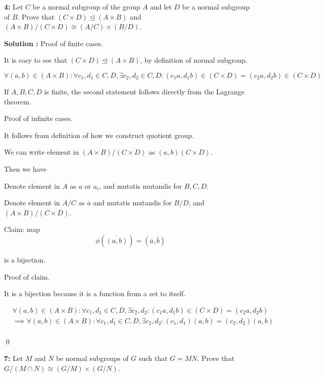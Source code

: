 \documentclass[11pt]{article}
\newenvironment{exercise}[1]
	{\noindent \textbf{#1:}}
	{\par \vspace{0.5\baselineskip}}
\newenvironment{solution}[1][\unskip]
	{\noindent \textbf{Solution #1:} }
	{\qed \pagebreak}
\begin{document}
\begin{exercise}{4}
	Let $C$	be a normal subgroup of the group $A$ and let $D$ be a normal subgroup of $B$.
	Prove that $(C \times D) \trianglelefteq (A \times B)$ and
	$(A \times B) / (C \times D) \cong (A / C) \times (B / D)$.
\end{exercise}

\begin{solution}
	Proof of finite cases.

	It is easy to see that $(C \times D) \trianglelefteq (A \times B)$,
	by definition of normal subgroup.

	\[
		\forall (a,b) \in (A \times B) : \forall  c_1,d_1 \in C,D, \exists c_2, d_2 \in C,D :
		(c_1a,d_1b) \in (C \times D) = (c_2a,d_2b) \in (C \times D)
	\]

	If $A,B,C,D$ is finite, the second statement follows directly from the Lagrange theorem.

	Proof of infinite cases.

	It follows from definition of how we construct quotient group.

	We can write element in $(A \times B)/(C \times D)$	as $(a,b)(C \times D)$.

	Then we have

	Denote element in $A$ as $a$ or $a_i$, and mutatis mutandis for $B,C,D$.

	Denote element in $A/C$ as $\overline{a}$ and mutatis mutandis for $B/D$, and $(A \times B) / (C \times D)$.

	Claim: map
	\[
		\phi(\overline{(a, b)}) = (\overline{a}, \overline{b})
	\]

	is a bijection.

	Proof of claim.

	It is a bijection because it is a function from a set to itself.

	\[
		\begin{split}
			& \forall (a,b) \in (A \times B) : \forall  c_1,d_1 \in C,D, \exists c_2, d_2 :
			(c_1a,d_1b) \in (C \times D) = (c_2a,d_2b)\\
			& \implies \forall (a,b) \in (A \times B) : \forall  c_1,d_1 \in C,D, \exists c_2, d_2 :
			(c_1, d_1)(a,b) = (c_2, d_2)(a,b)\\
		\end{split}
	\]



\end{solution}

\begin{exercise}{7}
	Let $M$ and $N$ be normal subgroups of $G$ such that $G=MN$.
	Prove that $G / (M \cap N) \cong (G / M) \times (G / N)$.
\end{exercise}
\end{document}
